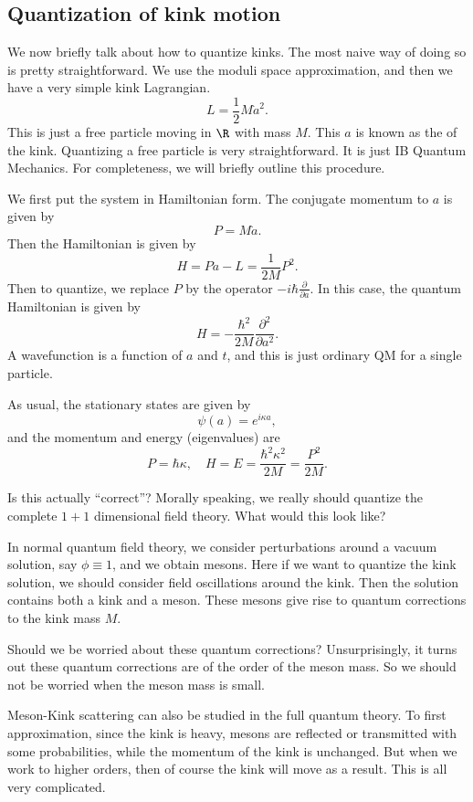 \documentclass[a4paper]{article}
\begin{document}
\subsection{Quantization of kink motion}
We now briefly talk about how to quantize kinks. The most naive way of doing so is pretty straightforward. We use the moduli space approximation, and then we have a very simple kink Lagrangian.
\[
  L = \frac{1}{2} M \dot{a}^2.
\]
This is just a free particle moving in $\R$ with mass $M$. This $a$ is known as the  of the kink. Quantizing a free particle is very straightforward. It is just IB Quantum Mechanics. For completeness, we will briefly outline this procedure.

We first put the system in Hamiltonian form. The conjugate momentum to $a$ is given by
\[
  P = M \dot{a}.
\]
Then the Hamiltonian is given by
\[
  H = P \dot{a} - L = \frac{1}{2M} P^2.
\]
Then to quantize, we replace $P$ by the operator $-i\hbar \frac{\partial}{\partial a}$. In this case, the quantum Hamiltonian is given by
\[
  H = - \frac{\hbar^2}{2M} \frac{\partial^2}{\partial a^2}.
\]
A wavefunction is a function of $a$ and $t$, and this is just ordinary QM for a single particle.

As usual, the stationary states are given by
\[
  \psi(a) = e^{i\kappa a},
\]
and the momentum and energy (eigenvalues) are
\[
  P = \hbar \kappa,\quad H = E = \frac{\hbar^2 \kappa^2}{2M} = \frac{P^2}{2M}.
\]

Is this actually ``correct''? Morally speaking, we really should quantize the complete $1 + 1$ dimensional field theory. What would this look like?

In normal quantum field theory, we consider perturbations around a vacuum solution, say $\phi \equiv 1$, and we obtain mesons. Here if we want to quantize the kink solution, we should consider field oscillations around the kink. Then the solution contains both a kink and a meson. These mesons give rise to quantum corrections to the kink mass $M$.

Should we be worried about these quantum corrections? Unsurprisingly, it turns out these quantum corrections are of the order of the meson mass. So we should not be worried when the meson mass is small.

Meson-Kink scattering can also be studied in the full quantum theory. To first approximation, since the kink is heavy, mesons are reflected or transmitted with some probabilities, while the momentum of the kink is unchanged. But when we work to higher orders, then of course the kink will move as a result. This is all very complicated.
\end{document}
